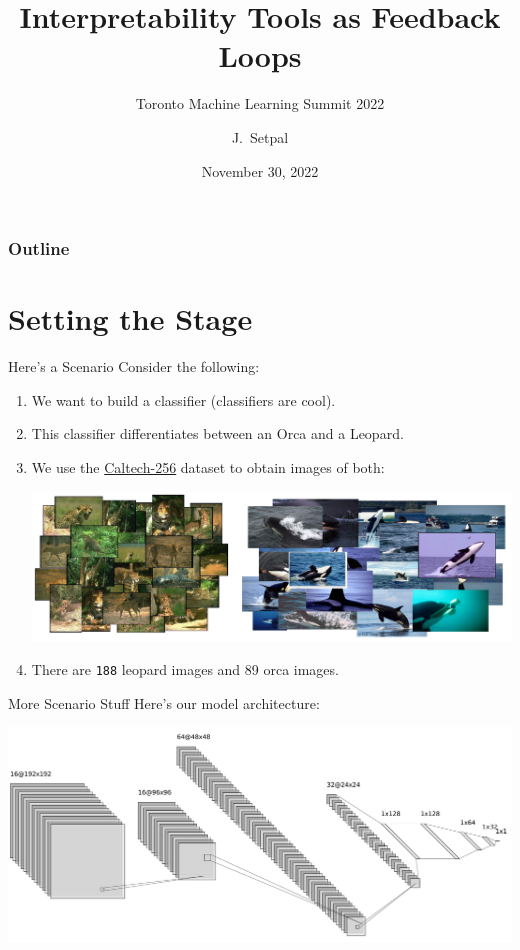 \documentclass{beamer}
\title[Leveraging Machine Interpretability]{Interpretability Tools as Feedback Loops}
\subtitle{Toronto Machine Learning Summit 2022}
\author{J.~Setpal}
\date{November 30, 2022}
\begin{document}
\frame{\titlepage}


\begin{frame}
\frametitle{Outline}
\tableofcontents
\end{frame}

\section{Setting the Stage}
\begin{frame}[fragile]{Here's a Scenario}
	Consider the following:
	\begin{enumerate}[label=\alph*.]
		\item We want to build a classifier (classifiers are cool). \pause
		\item This classifier differentiates between an Orca and a Leopard. \pause
		\item We use the \href{https://data.caltech.edu/records/nyy15-4j048}{Caltech-256} dataset to obtain images of both:
			\begin{center}
				\hspace*{-2em}  
				\includegraphics[width=\textwidth]{img/dataset.pdf}
			\end{center} \pause 
		\item There are \texttt{188} leopard images and 89 orca images.
	\end{enumerate} 
\end{frame}

\begin{frame}{More Scenario Stuff}
	Here's our model architecture:
	\begin{center}
		\includegraphics[width=\textwidth]{img/nn}
	\end{center}
\end{frame}
\end{document}
